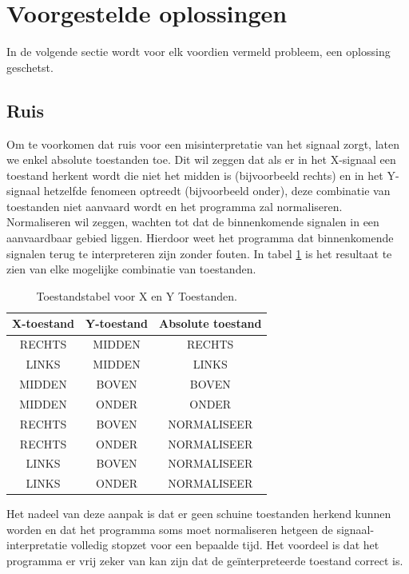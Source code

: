 \documentclass{article}
\begin{document}
\section{Voorgestelde oplossingen}
In de volgende sectie wordt voor elk voordien vermeld probleem, een oplossing geschetst.
\subsection{Ruis}
Om te voorkomen dat ruis voor een misinterpretatie van het signaal zorgt, laten we enkel absolute toestanden toe. Dit wil zeggen dat als er in het X-signaal een toestand herkent wordt die niet het midden is (bijvoorbeeld rechts) en in het Y-signaal hetzelfde fenomeen optreedt (bijvoorbeeld onder), deze combinatie van toestanden niet aanvaard wordt en het programma zal normaliseren. Normaliseren wil zeggen, wachten tot dat de binnenkomende signalen in een aanvaardbaar gebied liggen. Hierdoor weet het programma dat binnenkomende signalen terug te interpreteren zijn zonder fouten. In tabel \ref{tbl:toestandstabel} is het resultaat te zien van elke mogelijke combinatie van toestanden.
\begin{table}[H]
	\centering
	\vspace{0.5cm}
\begin{tabular}{|c|c||c|}
	\hline \textbf{X-toestand} & \textbf{Y-toestand} & \textbf{Absolute toestand} \\ 
	\hline RECHTS & MIDDEN & RECHTS \\ 
	\hline LINKS & MIDDEN & LINKS \\ 
	\hline MIDDEN & BOVEN & BOVEN \\ 
	\hline MIDDEN & ONDER & ONDER \\ 
	\hline RECHTS & BOVEN & NORMALISEER \\ 
	\hline RECHTS & ONDER & NORMALISEER \\ 
	\hline LINKS & BOVEN & NORMALISEER \\ 
	\hline LINKS & ONDER & NORMALISEER \\ 
	\hline 
\end{tabular}
	\caption{Toestandstabel voor X en Y Toestanden.}
	\label{tbl:toestandstabel}
\end{table}

Het nadeel van deze aanpak is dat er geen schuine toestanden herkend kunnen worden en dat het programma soms moet normaliseren hetgeen de signaal-interpretatie volledig stopzet voor een bepaalde tijd. Het voordeel is dat het programma er vrij zeker van kan zijn dat de ge\"interpreteerde toestand correct is.\\
\end{document}
